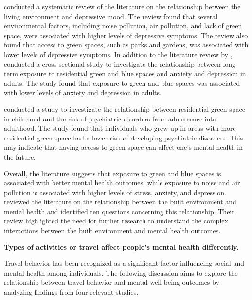 \documentclass[
  letterpaper,
  authoryear]{elsarticle}
\begin{document}
\citet{rautio2018} conducted a systematic review of the literature on
the relationship between the living environment and depressive mood. The
review found that several environmental factors, including noise
pollution, air pollution, and lack of green space, were associated with
higher levels of depressive symptoms. The review also found that access
to green spaces, such as parks and gardens, was associated with lower
levels of depressive symptoms. In addition to the literature review by
\citet{rautio2018} , \citet{gascon2018} conducted a cross-sectional
study to investigate the relationship between long-term exposure to
residential green and blue spaces and anxiety and depression in adults.
The study found that exposure to green and blue spaces was associated
with lower levels of anxiety and depression in adults.

\citet{engemann2019} conducted a study to investigate the relationship
between residential green space in childhood and the risk of psychiatric
disorders from adolescence into adulthood. The study found that
individuals who grew up in areas with more residential green space had a
lower risk of developing psychiatric disorders. This may indicate that
having access to green space can affect one's mental health in the
future.

Overall, the literature suggests that exposure to green and blue spaces
is associated with better mental health outcomes, while exposure to
noise and air pollution is associated with higher levels of stress,
anxiety, and depression. \citet{hoisington2019} reviewed the literature
on the relationship between the built environment and mental health and
identified ten questions concerning this relationship. Their review
highlighted the need for further research to understand the complex
interactions between the built environment and mental health outcomes.

\textbf{Types of activities or travel affect people's mental health
differently.}

Travel behavior has been recognized as a significant factor influencing
social and mental health among individuals. The following discussion
aims to explore the relationship between travel behavior and mental
well-being outcomes by analyzing findings from four relevant studies.
\end{document}
